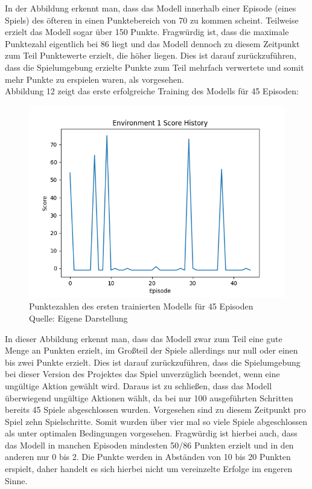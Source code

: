 In der Abbildung erkennt man, dass das Modell innerhalb einer Episode (eines Spiels) des öfteren in einen Punktebereich von 70 zu kommen scheint. Teilweise erzielt das Modell sogar über 150 Punkte. Fragwürdig ist, dass die maximale Punktezahl eigentlich bei 86 liegt und das Modell dennoch zu diesem Zeitpunkt zum Teil Punktewerte erzielt, die höher liegen. Dies ist darauf zurückzuführen, dass die Spielumgebung erzielte Punkte zum Teil mehrfach verwertete und somit mehr Punkte zu erspielen waren, als vorgesehen.\\

Abbildung 12 zeigt das erste erfolgreiche Training des Modells für 45 Episoden:
\nopagebreak
\begin{figure}[H]
	\includegraphics[width=1\textwidth]{Bilder/firstpropertraining100steps} 
	\caption[Punktezahlen des ersten trainierten Modells für 45 Episoden]{Punktezahlen des ersten trainierten Modells für 45 Episoden\\ Quelle: Eigene Darstellung}
\end{figure}

In dieser Abbildung erkennt man, dass das Modell zwar zum Teil eine gute Menge an Punkten erzielt, im Großteil der Spiele allerdings nur null oder einen bis zwei Punkte erzielt. Dies ist darauf zurückzuführen, dass die Spielumgebung bei dieser Version des Projektes das Spiel unverzüglich beendet, wenn eine ungültige Aktion gewählt wird. Daraus ist zu schließen, dass das Modell überwiegend ungültige Aktionen wählt, da bei nur 100 ausgeführten Schritten bereits 45 Spiele abgeschlossen wurden. Vorgesehen sind zu diesem Zeitpunkt pro Spiel zehn Spielschritte. Somit wurden über vier mal so viele Spiele abgeschlossen als unter optimalen Bedingungen vorgesehen. Fragwürdig ist hierbei auch, dass das Modell in manchen Episoden mindesten 50/86 Punkten erzielt und in den anderen nur 0 bis 2. Die Punkte werden in Abständen von 10 bis 20 Punkten erspielt, daher handelt es sich hierbei nicht um vereinzelte Erfolge im engeren Sinne.
